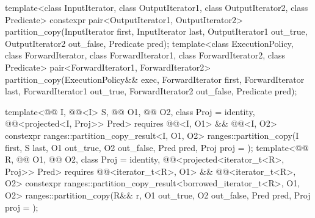 %
\begin{itemdecl}
template<class InputIterator, class OutputIterator1, class OutputIterator2, class Predicate>
  constexpr pair<OutputIterator1, OutputIterator2>
    partition_copy(InputIterator first, InputIterator last,
                   OutputIterator1 out_true, OutputIterator2 out_false, Predicate pred);
template<class ExecutionPolicy, class ForwardIterator, class ForwardIterator1,
         class ForwardIterator2, class Predicate>
  pair<ForwardIterator1, ForwardIterator2>
    partition_copy(ExecutionPolicy&& exec,
                   ForwardIterator first, ForwardIterator last,
                   ForwardIterator1 out_true, ForwardIterator2 out_false, Predicate pred);

template<@@ I, @@<I> S, @@ O1, @@ O2,
         class Proj = identity, @@<projected<I, Proj>> Pred>
  requires @@<I, O1> && @@<I, O2>
  constexpr ranges::partition_copy_result<I, O1, O2>
    ranges::partition_copy(I first, S last, O1 out_true, O2 out_false, Pred pred,
                           Proj proj = {});
template<@@ R, @@ O1, @@ O2,
         class Proj = identity,
         @@<projected<iterator_t<R>, Proj>> Pred>
  requires @@<iterator_t<R>, O1> &&
           @@<iterator_t<R>, O2>
  constexpr ranges::partition_copy_result<borrowed_iterator_t<R>, O1, O2>
    ranges::partition_copy(R&& r, O1 out_true, O2 out_false, Pred pred, Proj proj = {});
\end{itemdecl}

